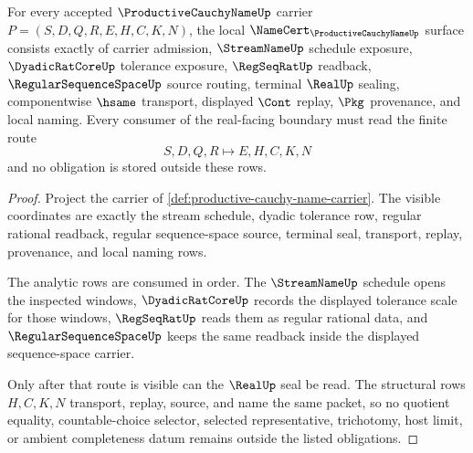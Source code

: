 \begin{theorem}
\label{thm:productive-cauchy-name-namecert-obligations}
For every accepted $\ProductiveCauchyNameUp$ carrier $P=(S,D,Q,R,E,H,C,K,N)$, the local $\NameCert_{\ProductiveCauchyNameUp}$ surface consists exactly of carrier admission, $\StreamNameUp$ schedule exposure, $\DyadicRatCoreUp$ tolerance exposure, $\RegSeqRatUp$ readback, $\RegularSequenceSpaceUp$ source routing, terminal $\RealUp$ sealing, componentwise $\hsame$ transport, displayed $\Cont$ replay, $\Pkg$ provenance, and local naming. Every consumer of the real-facing boundary must read the finite route
$$
S,D,Q,R \longmapsto E,H,C,K,N
$$
and no obligation is stored outside these rows.
\end{theorem}
\begin{proof}
Project the carrier of \autoref{def:productive-cauchy-name-carrier}. The visible coordinates are exactly the stream schedule, dyadic tolerance row, regular rational readback, regular sequence-space source, terminal seal, transport, replay, provenance, and local naming rows.

The analytic rows are consumed in order. The $\StreamNameUp$ schedule opens the inspected windows, $\DyadicRatCoreUp$ records the displayed tolerance scale for those windows, $\RegSeqRatUp$ reads them as regular rational data, and $\RegularSequenceSpaceUp$ keeps the same readback inside the displayed sequence-space carrier.

Only after that route is visible can the $\RealUp$ seal be read. The structural rows $H,C,K,N$ transport, replay, source, and name the same packet, so no quotient equality, countable-choice selector, selected representative, trichotomy, host limit, or ambient completeness datum remains outside the listed obligations.
\end{proof}

